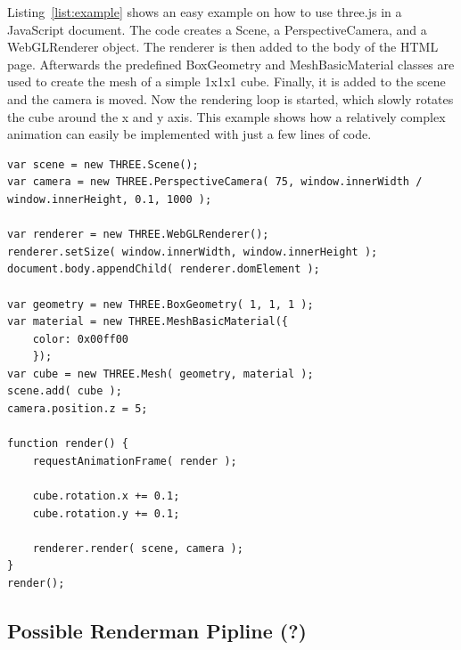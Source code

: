 Listing~\ref{list:example} shows an easy example on how to use three.js in a JavaScript document. The code creates a Scene, a PerspectiveCamera, and a WebGLRenderer object. The renderer is then added to the body of the HTML page. Afterwards the predefined BoxGeometry and MeshBasicMaterial classes are used to create the mesh of a simple 1x1x1 cube. Finally, it is added to the scene and the camera is moved. Now the rendering loop is started, which slowly rotates the cube around the x and y axis. This example shows how a relatively complex animation can easily be implemented with just a few lines of code.
\lstset{
caption=Three.js Example,
label=list:example,
language=JavaScript}
\begin{lstlisting}
var scene = new THREE.Scene();
var camera = new THREE.PerspectiveCamera( 75, window.innerWidth / window.innerHeight, 0.1, 1000 );

var renderer = new THREE.WebGLRenderer();
renderer.setSize( window.innerWidth, window.innerHeight );
document.body.appendChild( renderer.domElement );

var geometry = new THREE.BoxGeometry( 1, 1, 1 );
var material = new THREE.MeshBasicMaterial({
	color: 0x00ff00
	});
var cube = new THREE.Mesh( geometry, material );
scene.add( cube );
camera.position.z = 5;

function render() {
	requestAnimationFrame( render );
	
	cube.rotation.x += 0.1;
	cube.rotation.y += 0.1;

	renderer.render( scene, camera );
}
render();
\end{lstlisting}

\subsection{Possible Renderman Pipline (?)}